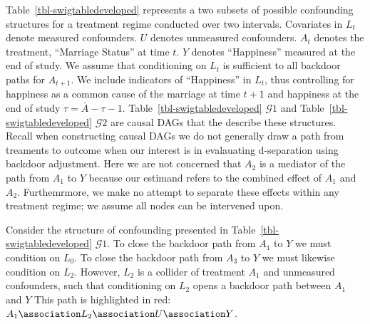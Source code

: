 \documentclass[
  single column]{article}
\begin{document}
Table~\ref{tbl-swigtabledeveloped} represents a two subsets of possible
confounding structures for a treatment regime conducted over two
intervals. Covariates in \(L_{t}\) denote measured confounders. \(U\)
denotes unmeasured confounders. \(A_t\) denotes the treatment,
``Marriage Status'' at time \(t\). \(Y\) denotes ``Happiness'' measured
at the end of study. We assume that conditioning on \(L_{t}\) is
sufficient to all backdoor paths for \(A_{t+1}\). We include indicators
of ``Happiness'' in \(L_{t}\), thus controlling for happiness as a
common cause of the marriage at time \(t+1\) and happiness at the end of
study \(\tau = \bar{A}-{\tau -1}\). Table~\ref{tbl-swigtabledeveloped}
\(\mathcal{G}1\) and Table~\ref{tbl-swigtabledeveloped} \(\mathcal{G}2\)
are causal DAGs that the describe these structures. Recall when
constructing causal DAGs we do not generally draw a path from treaments
to outcome when our interest is in evalauating d-separation using
backdoor adjustment. Here we are not concerned that \(A_2\) is a
mediator of the path from \(A_1\) to \(Y\) because our estimand refers
to the combined effect of \(A_1\) and \(A_2\). Furthemrmore, we make no
attempt to separate these effects within any treatment regime; we assume
all nodes can be intervened upon.

Consider the structure of confounding presented in
Table~\ref{tbl-swigtabledeveloped} \(\mathcal{G}1\). To close the
backdoor path from \(A_1\) to \(Y\) we must condition on \(L_0\). To
close the backdoor path from \(A_3\) to \(Y\) we must likewise condition
on \(L_2\). However, \(L_2\) is a collider of treatment \(A_1\) and
unmeasured confounders, such that conditioning on \(L_2\) opens a
backdoor path between \(A_1\) and \(Y\) This path is highlighted in red:
\(A_1 \association L_2 \association U \association Y\).
\end{document}
